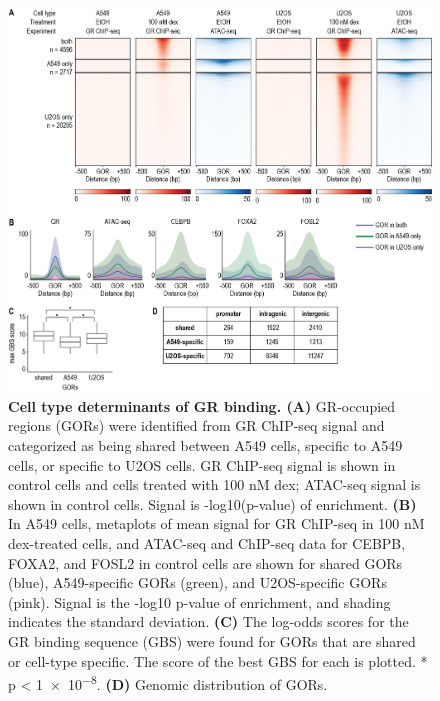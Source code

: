 \documentclass{article}
\begin{document}
{\begin{figure}[hb!]
\includegraphics[width=\textwidth]{figures/Figure2_v2_2021-04.png}
\caption{\textbf{Cell type determinants of GR binding. (A)} GR-occupied regions (GORs) were identified from GR ChIP-seq signal and categorized as being shared between A549 cells, specific to A549 cells, or specific to U2OS cells. GR ChIP-seq signal is shown in control cells and cells treated with 100 nM dex; ATAC-seq signal is shown in control cells. Signal is -log10(p-value) of enrichment. \textbf{(B)} In A549 cells, metaplots of mean signal for GR ChIP-seq in 100 nM dex-treated cells, and ATAC-seq and ChIP-seq data for CEBPB, FOXA2, and FOSL2 in control cells are shown for shared GORs (blue), A549-specific GORs (green), and U2OS-specific GORs (pink). Signal is the -log10 p-value of enrichment, and shading indicates the standard deviation. \textbf{(C)} The log-odds scores for the GR binding sequence (GBS) were found for GORs that are shared or cell-type specific. The score of the best GBS for each is plotted. * p < \num{1e-8}. \textbf{(D)} Genomic distribution of GORs.}
\label{fig:fig2}
\end{figure}

}
\end{document}
